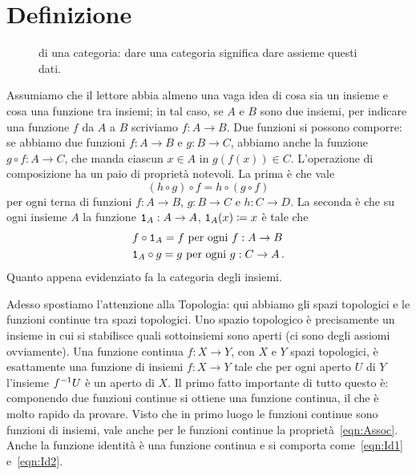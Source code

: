 
\section{Definizione}

\begin{figure}\centering

\caption{ di una categoria: dare una categoria significa dare assieme questi dati.}
\end{figure}

\begin{esempio}
Assumiamo che il lettore abbia almeno una vaga idea di cosa sia un insieme e cosa una funzione tra insiemi; in tal caso, se \(A\) e \(B\) sono due insiemi, per indicare una funzione \(f\) da \(A\) a \(B\) scriviamo \(f : A \to B\). Due funzioni si possono comporre: se abbiamo due funzioni \(f : A \to B\) e \(g : B \to C\), abbiamo anche la funzione \(g \circ f : A \to C\), che manda ciascun \(x \in A\) in \(g(f(x)) \in C\). L'operazione di composizione ha un paio di proprietà notevoli. La prima è che vale
\begin{equation}
(h \circ g) \circ f = h \circ (g \circ f) \label{eqn:Assoc}
\end{equation}
per ogni terna di funzioni \(f : A \to B\), \(g : B \to C\) e \(h : C \to D\). La seconda è che su ogni insieme \(A\) la funzione \(\mathtt{1}_A : A \to A\), \(\mathtt{1}_A(x) \coloneq x\) è tale che
\begin{align}
& f \circ \mathtt{1}_A = f \ \text{per ogni } f : A \to B \label{eqn:Id1} \\
& \mathtt{1}_A \circ g = g \ \text{per ogni } g : C \to A \label{eqn:Id2} \,.
\end{align}
Quanto appena evidenziato fa la categoria degli insiemi.
\end{esempio}

\begin{esempio}
Adesso spostiamo l'attenzione alla Topologia: qui abbiamo gli spazi topologici e le funzioni continue tra spazi topologici. Uno spazio topologico è precisamente un insieme in cui si stabilisce quali sottoinsiemi sono aperti (ci sono degli assiomi ovviamente). Una funzione continua \(f : X \to Y\), con \(X\) e \(Y\) spazi topologici, è esattamente una funzione di insiemi \(f : X \to Y\) tale che per ogni aperto \(U\) di \(Y\) l'insieme \(f^{-1} U\) è un aperto di \(X\). Il primo fatto importante di tutto questo è: componendo due funzioni continue si ottiene una funzione continua, il che è molto rapido da provare. Visto che in primo luogo le funzioni continue sono funzioni di insiemi, vale anche per le funzioni continue la proprietà~\eqref{eqn:Assoc}. Anche la funzione identità è una funzione continua e si comporta come~\eqref{eqn:Id1} e~\eqref{eqn:Id2}.
\end{esempio}

